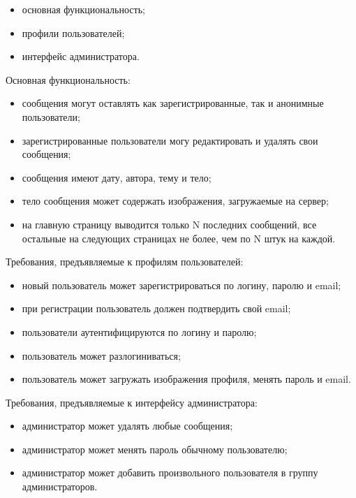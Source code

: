 \documentclass[oneside, final, 14pt]{extarticle}
\begin{document}
\begin{itemize}
\item{основная функциональность;}
\item{профили пользователей;}
\item{интерфейс администратора.}
\end{itemize}

\vspace{0.5cm}

Основная функциональность:
\begin{itemize}
\item{сообщения могут оставлять как зарегистрированные, так и анонимные пользователи;}
\item{зарегистрированные пользователи могу редактировать и удалять свои сообщения;}
\item{сообщения имеют дату, автора, тему и тело;}
\item{тело сообщения может содержать изображения, загружаемые на сервер;}
\item{на главную страницу выводится только N последних сообщений, все остальные на следующих страницах не более, чем по N штук на каждой.}
\end{itemize}

\vspace{0.5cm}

Требования, предъявляемые к профилям пользователей:
\begin{itemize}
\item{новый пользователь может зарегистрироваться по логину, паролю и email;}
\item{при регистрации пользователь должен подтвердить свой email;}
\item{пользователи аутентифицируются по логину и паролю;}
\item{пользователь может разлогиниваться;}
\item{пользователь может загружать изображения профиля, менять пароль и email.}
\end{itemize}

\vspace{0.5cm}

Требования, предъявляемые к интерфейсу администратора:
\begin{itemize}
\item{администратор может удалять любые сообщения;}
\item{администратор может менять пароль обычному пользователю;}
\item{администратор может добавить произвольного пользователя в группу администраторов.}
\end{itemize}
\end{document}
